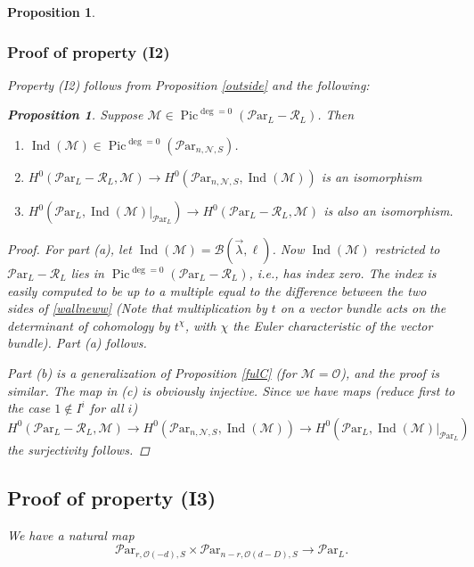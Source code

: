 \documentclass[11pt]{amsart}
\newcommand\op{\operatorname}
\newcommand\Pic{\operatorname{Pic}}
\newcommand\mn{\mathcal{N}}
\newcommand\ParL{\mathcal{P}\text{ar}_L}
\newcommand\Par{\mathcal{P}\text{ar} }
\newtheorem{proposition}[theorem]{Proposition}
\numberwithin{theorem}{subsection}
\begin{document}
{\begin{proposition}
\subsubsection{Proof of property (I2)}
Property (I2) follows from Proposition \ref{outside} and  the following:
\begin{proposition}\label{uselater}
Suppose $\mathcal{M}\in \Pic^{\deg=0}(\ParL-\mathcal{R}_L)$. Then
\begin{enumerate}
\item[(a)] $\op{Ind}(\mathcal{M})\in \Pic^{\deg=0}(\Par_{n,\mn,S})$.
\item[(b)] $H^0(\ParL-\mathcal{R}_L,\mathcal{M})\to H^0(\Par_{n,\mn,S},\op{Ind}(\mathcal{M}))$ is an isomorphism
\item[(c)] $H^0(\ParL,\op{Ind}(\mathcal{M})|_{\ParL})\to H^0(\ParL -\mathcal{R}_L,\mathcal{M})$ is also an isomorphism.
\end{enumerate}
\end{proposition}
\begin{proof}
For part (a), let $\op{Ind}(\mathcal{M})=\mathcal{B}(\vec{\lambda},\ell)$. Now $\op{Ind}(\mathcal{M})$ restricted to $\ParL-\mathcal{R}_L$ lies in  $\Pic^{\deg=0}(\ParL-\mathcal{R}_L)$, i.e., has index zero.
The index is easily computed to be  up to a multiple equal to the difference between the two sides of \eqref{wallneww} (Note that multiplication by $t$ on a vector bundle acts on the determinant of cohomology by $t^{\chi}$, with $\chi$ the Euler characteristic of the vector bundle).  Part (a)  follows.

Part (b) is a generalization of Proposition  \ref{fulC} (for $\mathcal{M}=\mathcal{O}$), and the proof is similar. The map in (c) is obviously injective. Since we have  maps (reduce first to the case $1\not\in I^i$ for all $i$)
$$ H^0(\ParL -\mathcal{R}_L,\mathcal{M})\to H^0(\Par_{n,\mn,S},\op{Ind}(\mathcal{M}))\to H^0(\ParL,\op{Ind}(\mathcal{M})|_{\ParL})$$
the surjectivity follows.
\end{proof}
\subsection{Proof of property (I3)}
We have a natural map
\begin{equation}\label{temper2}
{\Par}_{r,\mathcal{O}(-d),S}\times {\Par}_{n-r,\mathcal{O}(d-D),S} \to  \ParL.
\end{equation}


\end{proposition}}
\end{document}
